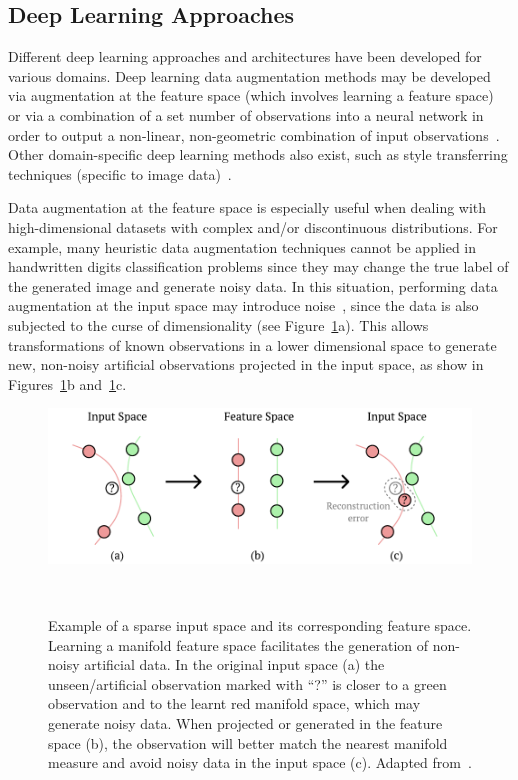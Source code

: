 \documentclass[parskip=full]{scrartcl}
\begin{document}
\subsection{Deep Learning Approaches}

Different deep learning approaches and architectures have been developed for
various domains. Deep learning data augmentation methods may be developed via
augmentation at the feature space (which involves learning a feature
space)~\cite{DeVries2017} or via a combination of a set number of observations
into a neural network in order to output a non-linear, non-geometric
combination of input observations~\cite{Wang2017}. Other domain-specific deep
learning methods also exist, such as style transferring techniques (specific
to image data)~\cite{Wang2017, Zhu2017}.

Data augmentation at the feature space is especially useful when dealing with
high-dimensional datasets with complex and/or discontinuous distributions.
For example, many heuristic data augmentation techniques cannot be applied in
handwritten digits classification problems since they may change the true
label of the generated image and generate noisy data. In this situation,
performing data augmentation at the input space may introduce
noise~\cite{Chu2020}, since the data is also subjected to the curse of
dimensionality (see Figure~\ref{fig:input_vs_feature_space}a). This allows
transformations of known observations in a lower dimensional space to generate
new, non-noisy artificial observations projected in the input space, as show
in Figures~\ref{fig:input_vs_feature_space}b
and~\ref{fig:input_vs_feature_space}c. 

\begin{figure}[htb]
	\centering
	\includegraphics[width=.75\linewidth]{../analysis/input_vs_feature_space}
    \caption{%
        Example of a sparse input space and its corresponding feature space.
        Learning a manifold feature space facilitates the generation of
        non-noisy artificial data. In the original input space (a) the
        unseen/artificial observation marked with ``?'' is closer to a green
        observation and to the learnt red manifold space, which may generate
        noisy data. When projected or generated in the feature space (b), the
        observation will better match the nearest manifold measure and avoid
        noisy data in the input space (c).
        Adapted from~\cite{Antoniou2017}.
    }~\label{fig:input_vs_feature_space}
\end{figure}
\end{document}
